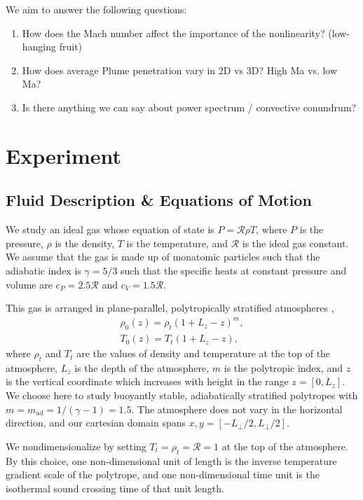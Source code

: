 \documentclass[twocolumn, amsmath, amsfonts, amssymb]{aastex62}
\begin{document}
We aim to answer the following questions:
\begin{enumerate}
\item How does the Mach number affect the importance of the nonlinearity? 
(low-hanging fruit)
\item How does average Plume penetration vary in 2D vs 3D? High Ma vs. low Ma?
\item Is there anything we can say about power spectrum / convective conundrum?
\end{enumerate}





\section{Experiment} \label{sec:experiment}
\subsection{Fluid Description \& Equations of Motion}
\label{sec:equations}
We study an ideal gas whose equation of state is
$P = \mathcal{R}\rho T$, where $P$ is the pressure, $\rho$ is the density,
$T$ is the temperature, and $\mathcal{R}$ is the ideal gas constant. 
We assume that the gas is made up of monatomic
particles such that the adiabatic index is $\gamma = 5/3$ such that the specific
heats at constant pressure and volume are $c_P = 2.5\mathcal{R}$ and $c_V = 1.5\mathcal{R}$.

This gas is arranged in plane-parallel, polytropically
stratified atmospheres \citep{anders&brown2017},
\begin{gather}
\rho_0(z) = \rho_{t}(1 + L_z - z)^m, \\
T_0(z)    = T_{t}(1 + L_z - z),
\end{gather}
where $\rho_{t}$ and $T_{t}$ are the values of density and temperature
at the top of the atmosphere,
$L_z$ is the depth of the atmosphere, $m$ is the polytropic index,
and $z$ is the vertical coordinate which increases with height in the
range $z=[0,L_z]$.
We choose here to study buoyantly stable, adiabatically stratified
polytropes with $m = m_{\text{ad}} = 1/(\gamma - 1) = 1.5$.
The atmosphere does not vary in the horizontal direction, 
and our cartesian domain
spans $x, y = [-L_\perp/2, L_\perp/2]$.

We nondimensionalize by setting $T_t = \rho_t = \mathcal{R} = 1$
at the top of the atmosphere.
By this choice, one non-dimensional unit of length is
the inverse temperature gradient scale of the polytrope, and 
one non-dimensional time unit is the isothermal sound crossing time of
that unit length.
\end{document}
